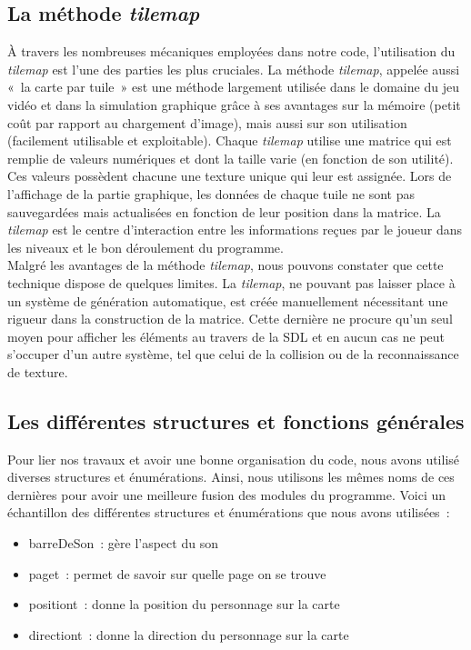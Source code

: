 \documentclass[12pt,a4paper]{article}
\begin{document}
        \subsection{La méthode \textit{tilemap}}
            \tabto{1cm} À travers les nombreuses mécaniques employées dans notre code, l’utilisation du \textit{tilemap} est l’une des parties les plus cruciales. La méthode \textit{tilemap}, appelée aussi «~la carte par tuile~» est une méthode largement utilisée dans le domaine du jeu vidéo et dans la simulation graphique grâce à ses avantages sur la mémoire (petit coût par rapport au chargement d’image), mais aussi sur son utilisation (facilement utilisable et exploitable). Chaque \textit{tilemap} utilise une matrice qui est remplie de valeurs numériques et dont la taille varie (en fonction de son utilité). Ces valeurs possèdent chacune une texture unique qui leur est assignée. Lors de l’affichage de la partie graphique, les données de chaque tuile ne sont pas sauvegardées mais actualisées en fonction de leur position dans la matrice. La \textit{tilemap} est le centre d’interaction entre les informations reçues par le joueur dans les niveaux et le bon déroulement du programme.\\
	
        	\tabto{1cm} Malgré les avantages de la méthode \textit{tilemap}, nous pouvons constater que cette technique dispose de quelques limites. La \textit{tilemap}, ne pouvant pas laisser place à un système de génération automatique, est créée manuellement nécessitant une rigueur dans la construction de la matrice. Cette dernière ne procure qu’un seul moyen pour afficher les éléments au travers de la SDL et en aucun cas ne peut s’occuper d’un autre système, tel que celui de la collision ou de la reconnaissance de texture.

         \subsection{Les différentes structures et fonctions générales}
            \tabto{1cm} Pour lier nos travaux et avoir une bonne organisation du code, nous avons utilisé diverses structures et énumérations. Ainsi, nous utilisons les mêmes noms de ces dernières pour avoir une meilleure fusion des modules du programme. Voici un échantillon des différentes structures et énumérations que nous avons utilisées~:\\

            \begin{itemize}
                \item barreDeSon~: gère l’aspect du son
                \item page\textunderscore t~: permet de savoir sur quelle page on se trouve
                \item position\textunderscore t~: donne la position du personnage sur la carte
                \item direction\textunderscore t~: donne la direction du personnage sur la carte\\
            \end{itemize}
\end{document}
